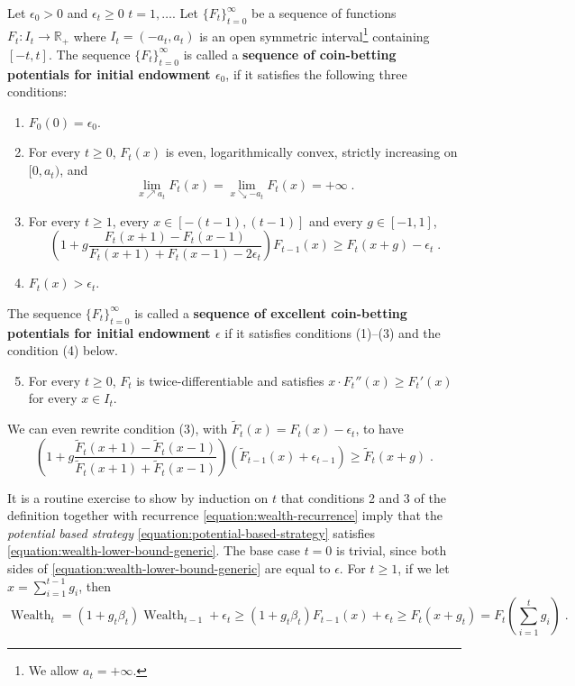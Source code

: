 \documentclass{colt2016_empty} %
\DeclareMathOperator{\Wealth}{Wealth}
\newcommand{\R}{\mathbb{R}}     %
\begin{document}
\begin{definition}
\label{definition:potential}
Let $\epsilon_0 > 0$ and $\epsilon_t\geq0$ $t=1,\ldots$. Let $\{F_t\}_{t=0}^\infty$ be a sequence of functions
$F_t:I_t  \to \R_+$ where $I_t = (-a_t, a_t)$ is an open symmetric
interval\footnote{We allow $a_t = +\infty$.} containing $[-t,t]$.  The sequence
$\{F_t\}_{t=0}^\infty$ is called a \textbf{sequence of coin-betting potentials
for initial endowment $\epsilon_0$}, if it satisfies the following three
conditions:
\begin{enumerate}[(1)]
\item $F_0(0) = \epsilon_0$.

\item For every $t \ge 0$, $F_t(x)$ is even, logarithmically convex, strictly
increasing on $[0,a_t)$, and
\begin{equation}
\label{equation:potential-limit-assumption}
\lim_{x \nearrow a_t} F_t(x) = \lim_{x \searrow -a_t} F_t(x) = +\infty \; .
\end{equation}

\item For every $t \ge 1$, every $x \in [-(t-1), (t-1)]$ and every $g \in [-1,1]$,
$$
\left(1 + g \frac{F_t(x + 1) - F_t(x - 1)}{F_t(x + 1) + F_t(x - 1) - 2 \epsilon_t} \right) F_{t-1}(x) \ge F_t(x+g) -\epsilon_t\; .
$$
\item $F_t(x) > \epsilon_t$.
\end{enumerate}
The sequence $\{F_t\}_{t=0}^\infty$ is called a
\textbf{sequence of excellent coin-betting potentials for initial
endowment $\epsilon$} if it satisfies conditions (1)--(3) and the condition (4)
below.
\begin{enumerate}[(1)]
\setcounter{enumi}{4}
\item For every $t \ge 0$, $F_t$ is twice-differentiable and
satisfies $x \cdot F_t''(x) \ge F_t'(x)$ for every $x \in I_t$.
\end{enumerate}
\end{definition}

We can even rewrite condition (3), with $\tilde{F}_t(x) = F_t(x) - \epsilon_t$, to have
\[
\left(1 + g \frac{\tilde{F}_t(x + 1) - \tilde{F}_t(x - 1)}{\tilde{F}_t(x + 1) + \tilde{F}_t(x - 1)} \right) \left(\tilde{F}_{t-1}(x) +\epsilon_{t-1}\right)\ge \tilde{F}_t(x+g)\; .
\]

It is a routine exercise to show by induction on $t$ that conditions 2 and 3 of
the definition together with recurrence \eqref{equation:wealth-recurrence} imply
that the \emph{potential based strategy}
\eqref{equation:potential-based-strategy} satisfies
\eqref{equation:wealth-lower-bound-generic}. The base case $t=0$ is trivial,
since both sides of \eqref{equation:wealth-lower-bound-generic} are equal to
$\epsilon$. For $t \ge 1$, if we let $x = \sum_{i=1}^{t-1} g_i$, then
$$
\Wealth_t
= (1+g_t \beta_t) \Wealth_{t-1} + \epsilon_{t}
\ge (1 + g_t \beta_t) F_{t-1}(x) + \epsilon_{t}
\ge F_t(x + g_t)
= F_t \left( \sum_{i=1}^t g_i \right) \; .
$$
\end{document}

